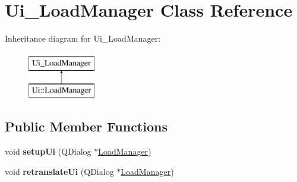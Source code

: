 \hypertarget{class_ui___load_manager}{\section{Ui\-\_\-\-Load\-Manager Class Reference}
\label{class_ui___load_manager}
}
Inheritance diagram for Ui\-\_\-\-Load\-Manager\-:\begin{figure}[H]
\begin{center}
\leavevmode
\includegraphics[height=2.000000cm]{class_ui___load_manager}
\end{center}
\end{figure}
\subsection*{Public Member Functions}
\begin{DoxyCompactItemize}
\item 
\hypertarget{class_ui___load_manager_a04fd9f8040d841609622e994ccb84afc}{void {\bfseries setup\-Ui} (Q\-Dialog $\ast$\hyperlink{class_load_manager}{Load\-Manager})}\label{class_ui___load_manager_a04fd9f8040d841609622e994ccb84afc}

\item 
\hypertarget{class_ui___load_manager_af2c80f799737f8561a02f3a175348114}{void {\bfseries retranslate\-Ui} (Q\-Dialog $\ast$\hyperlink{class_load_manager}{Load\-Manager})}\label{class_ui___load_manager_af2c80f799737f8561a02f3a175348114}

\end{DoxyCompactItemize}
